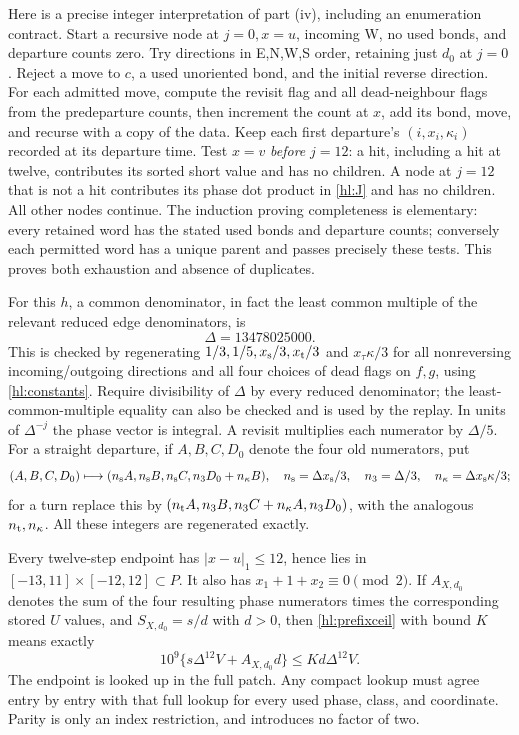 Here is a precise integer interpretation of part (iv), including
an enumeration contract.  Start a recursive node at
$j=0,x=u$, incoming W, no used bonds, and departure counts zero.
Try directions in E,N,W,S order, retaining just $d_0$ at $j=0$.
Reject a move to $c$, a used unoriented bond, and the initial
reverse direction.  For each admitted move, compute the revisit
flag and all dead-neighbour flags from the predeparture counts,
then increment the count at $x$, add its bond, move, and recurse
with a copy of the data.  Keep each first departure's
$(i,x_i,\kappa_i)$ recorded at its departure time.  Test $x=v$
\emph{before} $j=12$: a hit, including a hit at twelve, contributes
its sorted short value and has no children.  A node at $j=12$
that is not a hit contributes its phase dot product in
\eqref{hl:J} and has no children.  All other nodes continue.
The induction proving completeness is elementary: every retained
word has the stated used bonds and departure counts; conversely
each permitted word has a unique parent and passes precisely
these tests.  This proves both exhaustion and absence of duplicates.

For this $h$, a common denominator, in fact the least common
multiple of the relevant reduced edge denominators, is
\begin{equation}\label{hl:Delta}
 \Delta=13478025000.
\end{equation}
This is checked by regenerating $1/3,1/5,x_{\rm s}/3,x_{\rm t}/3$
and $x_\tau\kappa/3$ for all nonreversing incoming/outgoing
directions and all four choices of dead flags on $f,g$, using
\eqref{hl:constants}.  Require divisibility of $\Delta$ by
every reduced denominator; the least-common-multiple equality
can also be checked and is used by the replay.  In units of
$\Delta^{-j}$ the phase vector is integral.  A revisit multiplies
each numerator by $\Delta/5$.  For a straight departure, if
$A,B,C,D_0$ denote the four old numerators, put
\[
 (A,B,C,D_0)\longmapsto
 (n_{\rm s}A,n_{\rm s}B,n_{\rm s}C,n_3D_0+n_\kappa B),
 \quad
 n_{\rm s}=\Delta x_{\rm s}/3,\quad n_3=\Delta/3,\quad
 n_\kappa=\Delta x_{\rm s}\kappa/3;
\]
for a turn replace this by
$(n_{\rm t}A,n_3B,n_3C+n_\kappa A,n_3D_0)$, with the analogous
$n_{\rm t},n_\kappa$.  All these integers are regenerated exactly.

Every twelve-step endpoint has $|x-u|_1\le12$, hence lies in
$[-13,11]\times[-12,12]\subset P$.  It also has
$x_1+1+x_2\equiv0\pmod2$.  If $A_{X,d_0}$ denotes the sum of
the four resulting phase numerators times the corresponding
stored $U$ values, and $S_{X,d_0}=s/d$ with $d>0$, then
\eqref{hl:prefixceil} with bound $K$ means exactly
\begin{equation}\label{hl:clearedprefix}
 10^9\{s\Delta^{12}V+A_{X,d_0}d\}
                       \le Kd\Delta^{12}V.
\end{equation}
The endpoint is looked up in the full patch.  Any compact lookup
must agree entry by entry with that full lookup for every used
phase, class, and coordinate.  Parity is only an index restriction,
and introduces no factor of two.

